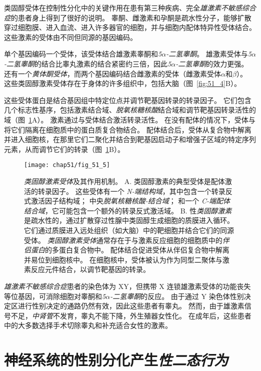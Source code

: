 类固醇受体在控制性分化中的关键作用在患有第三种疾病、完全\textit{雄激素不敏感综合症}的患者身上得到了很好的说明。
睾酮、雌激素和孕酮是疏水性分子，能够扩散穿过细胞膜、进入血流、进入许多器官的细胞，并与细胞内配体特异性受体结合。
这些激素的受体由不同但同源的基因编码。


单个基因编码一个受体，该受体结合雄激素睾酮和\textit{5$\alpha$-二氢睾酮}。
雄激素受体与\textit{5$\alpha$-二氢睾酮}的结合比睾丸激素的结合紧密约三倍，因此\textit{5$\alpha$-二氢睾酮}的效力更强。
还有一个\textit{黄体酮受体}，而两个基因编码结合雌激素的受体（雌激素受体$\alpha$和$\beta$）。
这些类固醇激素受体存在于身体的许多组织中，包括大脑（图~\ref{fig:51_4}B）。


这些受体蛋白是结合基因组中特定位点并调节靶基因转录的转录因子。
它们包含几个标志性基序，包括激素结合域、\textit{脱氧核糖核酸}结合域和调节靶基因转录活性的域（图~\ref{fig:51_5}A）。
激素通过与受体结合激活转录活性。
在没有配体的情况下，受体与将它们隔离在细胞质中的蛋白质复合物结合。
配体结合后，受体从复合物中解离并进入细胞核，在那里它们二聚化并结合到靶基因启动子和增强子区域的特定序列元素，从而调节它们的转录（图~\ref{fig:51_5}B）。


\begin{figure}[htbp]
	\centering
	\texttt{[image: chap51/fig\_51\_5]}
	\caption{\textit{类固醇激素受体}及其作用机制。
		A. 类固醇激素的典型受体是配体激活的转录因子。
		这些受体有一个 \textit{N-端结构域}，其中包含一个转录反式激活因子结构域；
		中央\textit{脱氧核糖核酸-结合域}；
		和一个 \textit{C-端配体结合域}，它可能包含一个额外的转录反式激活域。
		B. 性\textit{类固醇激素}是疏水性的，通过扩散穿过性腺中类固醇生成细胞的质膜进入循环。
		它们通过质膜进入远处组织（如大脑）中的靶细胞并结合它们的同源受体。
		\textit{类固醇激素受体}通常存在于与激素反应细胞的细胞质中的\textit{伴侣蛋白}的多蛋白复合物中。
		配体结合促进受体从伴侣复合物中解离并易位到细胞核中。
		在细胞核中，受体被认为作为同型二聚体与激素反应元件结合，以调节靶基因的转录\cite{wierman2007sex}。}
	\label{fig:51_5}
\end{figure}


\textit{雄激素不敏感综合症}患者的染色体为 XY，但携带 X 连锁雄激素受体的功能丧失等位基因，可消除细胞对睾酮和\textit{5$\alpha$-二氢睾酮}的反应。
由于通过 Y 染色体性别决定区进行性别决定的通路仍然有效，因此这些患者有睾丸。
然而，由于雄激素信号不足，\textit{中肾管}不发育，睾丸不能下降，外生殖器女性化。
在成年后，这些患者中的大多数选择手术切除睾丸和补充适合女性的激素。



\section{神经系统的性别分化产生\textit{性二态行为}}

